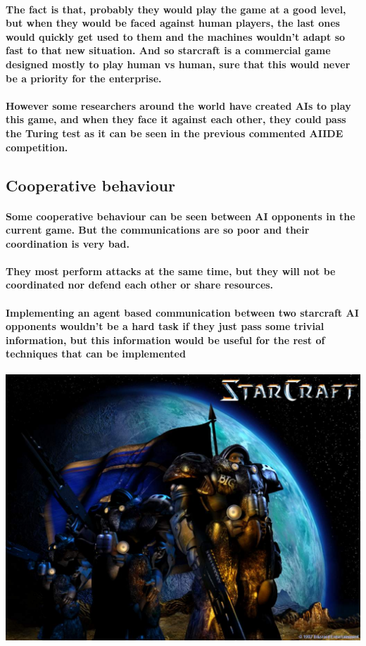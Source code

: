 \documentclass[a4paper,10pt]{article}
\newcommand{\p}[1]{\paragraph{\indent\textnormal{#1}}}
\begin{document}
\p{The fact is that, probably they would play the game at a good level, but when they would be faced against human players, the last ones would quickly get used to them and the machines wouldn't adapt so fast to that new situation. And so starcraft is a commercial game designed mostly to play human vs human, sure that this would never be a priority for the enterprise.}

\p{However some researchers around the world have created AIs to play this game, and when they face it against each other, they could pass the Turing test as it can be seen in the previous commented AIIDE competition.}


\subsection{Cooperative behaviour}


\p{Some cooperative behaviour can be seen between AI opponents in the current game. But the communications are so poor and their coordination is very bad.}


\p{They most perform attacks at the same time, but they will not be coordinated nor defend each other or share resources.}

\p{Implementing an agent based communication between two starcraft AI opponents wouldn't be a hard task if they just pass some trivial information, but this information would be useful for the rest of techniques that can be implemented}


\begin{center}\vfill
\includegraphics[scale=0.25]{diapos1/win.jpg}
\end{center}
\end{document}
